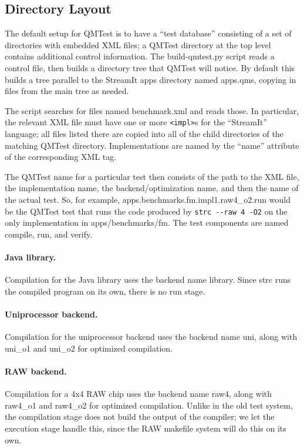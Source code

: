 \documentclass[11pt]{article}
\begin{document}
\subsection{Directory Layout}

The default setup for QMTest is to have a ``test
database'' consisting of a set of directories with embedded XML files;
a \textsf{QMTest} directory at the top level contains additional
control information.  The \textsf{build-qmtest.py} script reads a
control file, then builds a directory tree that QMTest will notice.
By default this builds a tree parallel to the StreamIt \textsf{apps}
directory named \textsf{apps.qms}, copying in files from the main tree
as needed.

The script searches for files named \textsf{benchmark.xml} and reads
those.  In particular, the relevant XML file must have one or more
\verb|<impl>|s for the ``StreamIt'' language; all files listed there
are copied into all of the child directories of the matching QMTest
directory.  Implementations are named by the ``name'' attribute of the
corresponding XML tag.

The QMTest name for a particular test then consists of the path to the
XML file, the implementation name, the backend/optimization name, and
then the name of the actual test.  So, for example,
\textsf{apps.benchmarks.fm.impl1.raw4\_o2.run} would be the QMTest test
that runs the code produced by \texttt{strc -{}-raw 4 -O2} on the only
implementation in \textsf{apps/benchmarks/fm}.  The test components
are named \textsf{compile}, \textsf{run}, and \textsf{verify}.

\paragraph{Java library.}  Compilation for the Java library uses the
backend name \textsf{library}.  Since \textsf{strc} runs the compiled
program on its own, there is no \textsf{run} stage.

\paragraph{Uniprocessor backend.}  Compilation for the uniprocessor
backend uses the backend name \textsf{uni}, along with
\textsf{uni\_o1} and \textsf{uni\_o2} for optimized compilation.

\paragraph{RAW backend.}  Compilation for a 4x4 RAW chip uses the
backend name \textsf{raw4}, along with \textsf{raw4\_o1} and
\textsf{raw4\_o2} for optimized compilation.  Unlike in the old test
system, the compilation stage does not build the output of the
compiler; we let the execution stage handle this, since the RAW
makefile system will do this on its own.
\end{document}
